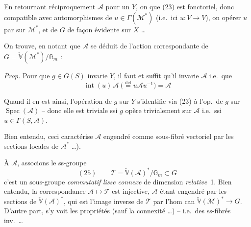 \documentclass[11pt,a4paper]{article}
\begin{document}
En retournant réciproquement $\mathcal{A}$ pour un 
 $Y$, on \ill{} que 
 (23) est fonctoriel, donc compatible avec
 automorphismes de $u \in \Gamma(\mathcal{M}^{*})$ (i.e.\ ici
$u : V \to V$), on  opérer $u$ par 
sur $\mathcal{M}^{*}$, et de $G$ de façon évidente sur $X$ \ldots

On trouve, en notant que $\mathcal{A}$ se déduit de l'action correspondante de
$G = \check{\mathbb{V}}(\mathcal{M}^{*})/\mathbb{G}_m$ :

\emph{Prop.} Pour que $g \in G(S)$ invarie $Y$, il faut et suffit qu'il invarie
$\mathcal{A}$ i.e.\ que \struck{\ill{}} 
\[
  \operatorname{int}(u)\, \mathcal{A} \ \bigl(\overset{\mathrm{def}}{=} u \mathcal{A} u^{-1}\bigr) = \mathcal{A}
\]

Quand il en est ainsi, l'opération de $g$ sur $Y$ s'identifie via (23) à
l'op.\ de $g$ \add{(\ill{})} sur $\operatorname{Spec}(\mathcal{A})$ -- donc elle est
triviale ssi $g$ opère trivialement sur $\mathcal{A}$ i.e.\ ssi $u \in \Gamma(S, \mathcal{A})$.

Bien entendu, ceci caractérise $\mathcal{A}$  engendré comme
sous-fibré vectoriel par les sections locales de $\mathcal{A}^{*}$ \ldots).

À \struck{\ill{}} $\mathcal{A}$, associons le ss-groupe
\[
  (25) \qquad \mathcal{T} = \check{\mathbb{V}}(\mathcal{A})^{*}/\mathbb{G}_m \subset G
\]
c'est un sous-groupe \emph{commutatif} \emph{lisse} \emph{connexe} de dimension
\emph{relative}~1. Bien entendu, la correspondance $\mathcal{A} \mapsto \mathcal{T}$
est injective, $\mathcal{A}$ étant engendré par \struck{\ill{}} les sections de
$\check{\mathbb{V}}(\mathcal{A})^{*}$, qui est l'image inverse de $\mathcal{T}$ par
l'hom can  $\check{\mathbb{V}}(\mathcal{M})^{*} \to G$.
D'autre part,   s'y voit les propriétés
 (sauf la connexité \ldots)
 -- i.e.\ des ss-fibrés inv.\ \ldots
{}
\end{document}

